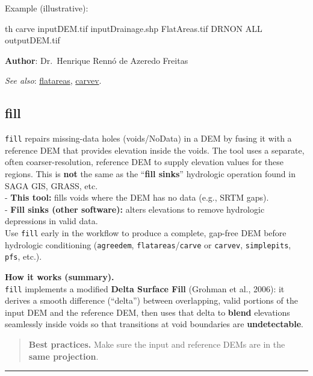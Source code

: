 \documentclass[
]{book}
\newenvironment{Shaded}{\begin{snugshade}}{\end{snugshade}}
\newcommand{\ExtensionTok}[1]{#1}
\newcommand{\NormalTok}[1]{#1}
\theoremstyle{definition}
\theoremstyle{definition}
\theoremstyle{definition}
\theoremstyle{definition}
\theoremstyle{remark}
\begin{document}
Example (illustrative):

\begin{Shaded}
\begin{Highlighting}[]
\ExtensionTok{th}\NormalTok{ carve inputDEM.tif inputDrainage.shp FlatAreas.tif DRNON ALL outputDEM.tif}
\end{Highlighting}
\end{Shaded}

\textbf{Author}: Dr.~Henrique Rennó de Azeredo Freitas

\emph{See also}: \hyperref[flatareas]{flatareas}, \hyperref[carvev]{carvev}.

\subsection{fill}\label{fill}

\texttt{fill} repairs missing-data holes (voids/NoData) in a DEM by fusing it with a reference DEM that provides elevation inside the voids. The tool uses a separate, often coarser-resolution, reference DEM to supply elevation values for these regions. This is \textbf{not} the same as the ``\textbf{fill sinks}'' hydrologic operation found in SAGA GIS, GRASS, etc.\\
- \textbf{This tool:} fills voids where the DEM has no data (e.g., SRTM gaps).\\
- \textbf{Fill sinks (other software):} alters elevations to remove hydrologic depressions in valid data.\\
Use \texttt{fill} early in the workflow to produce a complete, gap-free DEM before hydrologic conditioning (\texttt{agreedem}, \texttt{flatareas}/\texttt{carve} or \texttt{carvev}, \texttt{simplepits}, \texttt{pfs}, etc.).

\textbf{How it works (summary).}\\
\texttt{fill} implements a modified \textbf{Delta Surface Fill} (Grohman et al., 2006): it derives a smooth difference (``delta'') between overlapping, valid portions of the input DEM and the reference DEM, then uses that delta to \textbf{blend} elevations seamlessly inside voids so that transitions at void boundaries are \textbf{undetectable}.

\begin{quote}
\textbf{Best practices.} Make sure the input and reference DEMs are in the \textbf{same projection}.
\end{quote}

\begin{center}\rule{0.5\linewidth}{0.5pt}\end{center}
\end{document}
